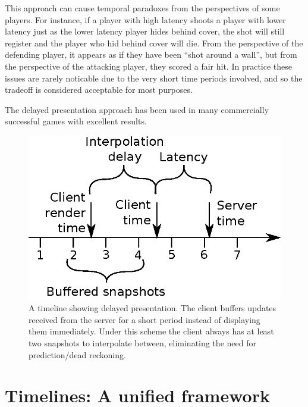 \documentclass[conference]{IEEEtran}
\begin{document}
	This approach can cause temporal paradoxes from the perspectives of some players. For instance, if a player with high latency shoots a player with lower latency just as the lower latency player hides behind cover, the shot will still register and the player who hid behind cover will die. From the perspective of the defending player, it appears as if they have been ``shot around a wall'', but from the perspective of the attacking player, they scored a fair hit. In practice these issues are rarely noticable due to the very short time periods involved, and so the tradeoff is considered acceptable for most purposes.

	The delayed presentation approach has been used in many commercially successful games with excellent results.

	\begin{figure}
		\centering\includegraphics[width=\linewidth]{figures/interpolation_timeline.eps}
		\caption{A timeline showing delayed presentation. The client buffers updates received from the server for a short period instead of displaying them immediately. Under this scheme the client always has at least two snapshots to interpolate between, eliminating the need for prediction/dead reckoning.}
		\label{fig:interpolation_timeline}
	\end{figure}



	\section{Timelines: A unified framework}
\end{document}
